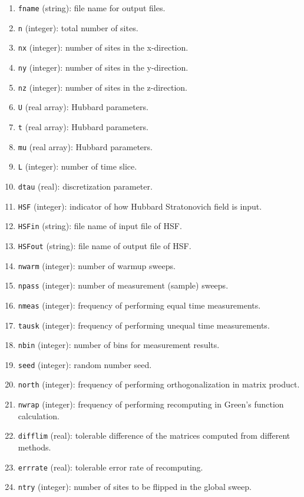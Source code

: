 \documentclass[12pt]{article}
\begin{document}
\begin{enumerate}
  \item \verb"fname" (string): file name for output files.
  \item \verb"n" (integer): total number of sites.
  \item \verb"nx" (integer): number of sites in the x-direction.
  \item \verb"ny" (integer): number of sites in the y-direction.
  \item \verb"nz" (integer): number of sites in the z-direction.
  \item \verb"U" (real array): Hubbard parameters.
  \item \verb"t" (real array): Hubbard parameters.
  \item \verb"mu" (real array): Hubbard parameters.
  \item \verb"L" (integer): number of time slice.
  \item \verb"dtau" (real): discretization parameter.
  \item \verb"HSF" (integer): indicator of how Hubbard Stratonovich field is input.
  \item \verb"HSFin" (string): file name of input file of HSF.
  \item \verb"HSFout" (string): file name of output file of HSF.
  \item \verb"nwarm" (integer): number of warmup sweeps.
  \item \verb"npass" (integer): number of measurement (sample) sweeps.
  \item \verb"nmeas" (integer): frequency of performing equal time measurements.
  \item \verb"tausk" (integer): frequency of performing unequal time measurements.
  \item \verb"nbin" (integer): number of bins for measurement results.
  \item \verb"seed" (integer): random number seed.
  \item \verb"north" (integer): frequency of performing orthogonalization in matrix product.
  \item \verb"nwrap" (integer): frequency of performing recomputing in Green's function calculation.
  \item \verb"difflim" (real): tolerable difference of the matrices computed from different methods.
  \item \verb"errrate" (real): tolerable error rate of recomputing.
  \item \verb"ntry" (integer): number of sites to be flipped in the global sweep.
\end{enumerate}
\end{document}

